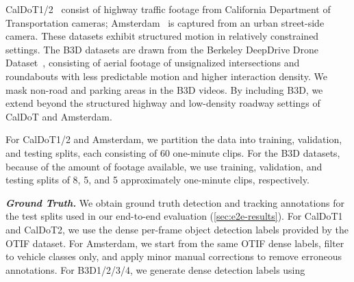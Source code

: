 CalDoT1/2~\cite{bastani2022otif} consist of highway traffic footage from California Department of Transportation cameras;
Amsterdam~\cite{kang2017noscope} is captured from an urban street-side camera.
These datasets exhibit structured motion in relatively constrained settings.
The B3D datasets are drawn from the Berkeley DeepDrive Drone Dataset~\cite{wu2025b3d},
consisting of aerial footage of unsignalized intersections and roundabouts with less predictable motion and higher interaction density.
We mask non-road and parking areas in the B3D videos.
By including B3D, we extend beyond the structured highway and low-density roadway settings of CalDoT and Amsterdam.

For CalDoT1/2 and Amsterdam,
we partition the data into training,
validation,
and testing splits,
each consisting of 60 one-minute clips.
For the B3D datasets,
because of the amount of footage available,
we use training,
validation,
and testing splits of 8,
5,
and 5 approximately one-minute clips,
respectively.


\textbf{\em Ground Truth.}
We obtain ground truth detection and tracking annotations for the test splits used in our end-to-end evaluation (\autoref{sec:e2e-results}).
For CalDoT1 and CalDoT2,
we use the dense per-frame object detection labels provided by the OTIF dataset.
For Amsterdam,
we start from the same OTIF dense labels,
filter to vehicle classes only,
and apply minor manual corrections to remove erroneous annotations.
For B3D1/2/3/4,
we generate dense detection labels using

